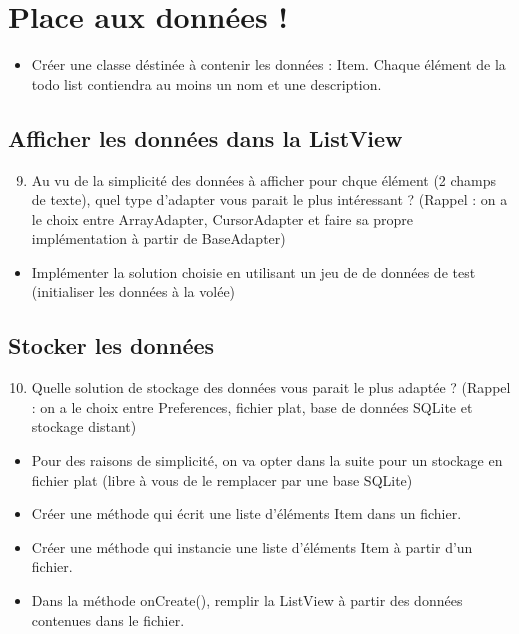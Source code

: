 \documentclass{article}
\begin{document}
 \section{Place aux données !}
 \begin{itemize}
  \item Créer une classe déstinée à contenir les données : Item. Chaque élément de la todo list contiendra au moins un nom et une description.
 \end{itemize}
 \subsection{Afficher les données dans la ListView}
   \begin{enumerate}
 \setcounter{enumi}{8}
\item Au vu de la simplicité des données à afficher pour chque élément (2 champs de texte), quel type d'adapter vous parait le plus intéressant ? 
(Rappel : on a le choix entre ArrayAdapter, CursorAdapter et faire sa propre implémentation à partir de BaseAdapter)
\end{enumerate}
 \begin{itemize}
  \item Implémenter la solution choisie en utilisant un jeu de de données de test (initialiser les données à la volée)
 \end{itemize}
  \subsection{Stocker les données}
  \begin{enumerate}
 \setcounter{enumi}{9}
\item Quelle solution de stockage des données vous parait le plus adaptée ? (Rappel : on a le choix entre Preferences, fichier plat, base de données SQLite et stockage distant)
\end{enumerate}
 \begin{itemize}
  \item Pour des raisons de simplicité, on va opter dans la suite pour un stockage en fichier plat (libre à vous de le remplacer par une base SQLite)
  \item Créer une méthode qui écrit une liste d'éléments Item dans un fichier.
  \item Créer une méthode qui instancie une liste d'éléments Item à partir d'un fichier.
  \item Dans la méthode onCreate(), remplir la ListView à partir des données contenues dans le fichier.
 \end{itemize}
\end{document}
